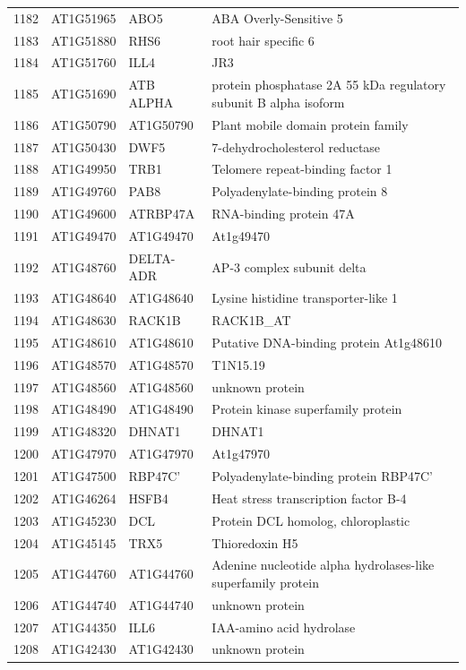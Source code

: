 \documentclass[11pt]{article}
\begin{document}
\begin{center}
\begin{tabular}{rlll}
1182 & AT1G51965 & ABO5 & ABA Overly-Sensitive 5\\
1183 & AT1G51880 & RHS6 & root hair specific 6\\
1184 & AT1G51760 & ILL4 & JR3\\
1185 & AT1G51690 & ATB ALPHA & protein phosphatase 2A 55 kDa regulatory subunit B alpha isoform\\
1186 & AT1G50790 & AT1G50790 & Plant mobile domain protein family\\
1187 & AT1G50430 & DWF5 & 7-dehydrocholesterol reductase\\
1188 & AT1G49950 & TRB1 & Telomere repeat-binding factor 1\\
1189 & AT1G49760 & PAB8 & Polyadenylate-binding protein 8\\
1190 & AT1G49600 & ATRBP47A & RNA-binding protein 47A\\
1191 & AT1G49470 & AT1G49470 & At1g49470\\
1192 & AT1G48760 & DELTA-ADR & AP-3 complex subunit delta\\
1193 & AT1G48640 & AT1G48640 & Lysine histidine transporter-like 1\\
1194 & AT1G48630 & RACK1B & RACK1B\_AT\\
1195 & AT1G48610 & AT1G48610 & Putative DNA-binding protein At1g48610\\
1196 & AT1G48570 & AT1G48570 & T1N15.19\\
1197 & AT1G48560 & AT1G48560 & unknown protein\\
1198 & AT1G48490 & AT1G48490 & Protein kinase superfamily protein\\
1199 & AT1G48320 & DHNAT1 & DHNAT1\\
1200 & AT1G47970 & AT1G47970 & At1g47970\\
1201 & AT1G47500 & RBP47C' & Polyadenylate-binding protein RBP47C'\\
1202 & AT1G46264 & HSFB4 & Heat stress transcription factor B-4\\
1203 & AT1G45230 & DCL & Protein DCL homolog, chloroplastic\\
1204 & AT1G45145 & TRX5 & Thioredoxin H5\\
1205 & AT1G44760 & AT1G44760 & Adenine nucleotide alpha hydrolases-like superfamily protein\\
1206 & AT1G44740 & AT1G44740 & unknown protein\\
1207 & AT1G44350 & ILL6 & IAA-amino acid hydrolase\\
1208 & AT1G42430 & AT1G42430 & unknown protein\\

\end{tabular}
\end{center}
\end{document}
